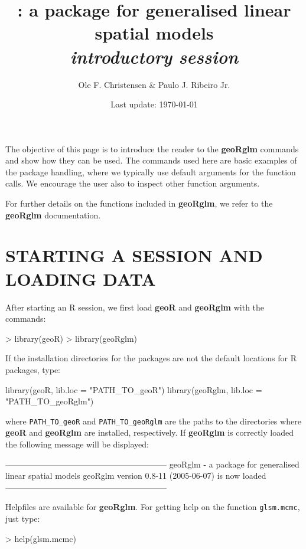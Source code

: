 \documentclass[12pt,a4paper]{article}
\title{\pkg{geoRglm} : a package for  generalised linear spatial models
\\{\it introductory session}}
\author{Ole F. Christensen \& Paulo J. Ribeiro Jr.}
\date{Last update: \today}
\newcommand{\strong}[1]{{\textbf{ #1}}}
\let\pkg=\strong
\newcommand{\code}[1]{\texttt{\small #1}}
\newcommand{\R}{{\textsf{R}}{}}
\begin{document}
\maketitle




The objective of this page is to introduce the reader to the 
\pkg{geoRglm} commands and show how they can be used.
The commands used here are basic examples of the package handling, where we typically use default arguments for the function calls.
We encourage the user also to inspect other function arguments.

For further details on the functions included in \pkg{geoRglm}, we refer to the \pkg{geoRglm} documentation.

\section{STARTING A SESSION AND LOADING DATA}
After starting an \R{} session, we first load \pkg{geoR} and \pkg{geoRglm} with the commands:
\begin{Schunk}
\begin{Sinput}
> library(geoR)
> library(geoRglm)
\end{Sinput}
\end{Schunk}

If the installation directories for the packages are not the default locations for \R{} packages, type:
\begin{Rin}
  library(geoR, lib.loc = "PATH_TO_geoR")
  library(geoRglm, lib.loc = "PATH_TO_geoRglm")
\end{Rin}
where \verb+PATH_TO_geoR+ and \verb+PATH_TO_geoRglm+ are the paths to the directories where \pkg{geoR} and \pkg{geoRglm} are installed, respectively.
If \pkg{geoRglm} is correctly loaded the following message will be displayed:
\begin{Schunk}
\begin{Soutput}
-----------------------------------------------------------
geoRglm - a package for generalised linear spatial models
geoRglm version 0.8-11 (2005-06-07) is now loaded
-----------------------------------------------------------
\end{Soutput}
\end{Schunk}
Helpfiles are available for \pkg{geoRglm}. For getting help on the function \code{glsm.mcmc}, just type:  
\begin{Rin}
> help(glsm.mcmc)
\end{Rin}
\end{document}
